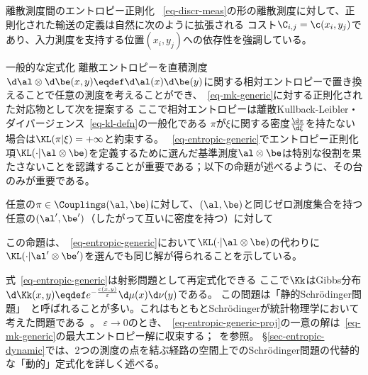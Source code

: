 \begin{rem1}{離散測度間のエントロピー正則化}\label{rem:entrop-reg}
~\eqref{eq-discr-meas}の形の離散測度に対して、正則化された輸送の定義は自然に次のように拡張される
\eql{\label{eq-entropic-disc-meas}
	\MK_\c^\varepsilon(\al,\be) \eqdef \MKD_\C^\varepsilon(\a,\b),
}
コスト$\C_{i,j}=\c(x_i,y_j)$であり、入力測度を支持する位置$(x_i,y_j)$への依存性を強調している。
\end{rem1}


\begin{rem2}{一般的な定式化}
離散エントロピーを直積測度$\d\al\otimes\d\be(x,y) \eqdef \d\al(x)\d\be(y)$に関する相対エントロピーで置き換えることで任意の測度を考えることができ、~\eqref{eq-mk-generic}に対する正則化された対応物として次を提案する
ここで相対エントロピーは離散Kullback-Leibler・ダイバージェンス~\eqref{eq-kl-defn}の一般化である
$\pi$が$\xi$に関する密度$\frac{\d \pi}{\d\xi}$を持たない場合は$\KL(\pi|\xi)=+\infty$と約束する。
%
~\eqref{eq-entropic-generic}でエントロピー正則化項$\KL(\cdot|\al\otimes\be)$を定義するために選んだ基準測度$\al\otimes\be$は特別な役割を果たさないことを認識することが重要である；以下の命題が述べるように、その台のみが重要である。

\begin{prop}
	任意の$\pi \in \Couplings(\al,\be)$に対して、$(\al,\be)$と同じゼロ測度集合を持つ任意の$(\al',\be')$（したがって互いに密度を持つ）に対して
\end{prop}

この命題は、~\eqref{eq-entropic-generic}において$\KL(\cdot|\al\otimes\be)$の代わりに$\KL(\cdot|\al'\otimes\be')$を選んでも同じ解が得られることを示している。


式~\eqref{eq-entropic-generic}は射影問題として再定式化できる
\eql{\label{eq-entropic-generic-proj}
	\umin{\pi \in \Couplings(\al,\be)} \KL(\pi|\Kk),
}
ここで$\Kk$はGibbs分布$\d\Kk(x,y) \eqdef e^{-\frac{c(x,y)}{\varepsilon}} \d\mu(x)\d\nu(y)$である。
%
この問題は「静的Schrödinger問題」~\citep{LeonardSchroedinger,RuschendorfThomsen}と呼ばれることが多い。これはもともとSchrödingerが統計物理学において考えた問題である~\citep{Schroedinger31}。
%
$\varepsilon \rightarrow 0$のとき、~\eqref{eq-entropic-generic-proj}の一意の解は~\eqref{eq-mk-generic}の最大エントロピー解に収束する；~\citep{leonard2012schrodinger,2017-carlier-SIMA}を参照。
%
\S\ref{sec-entropic-dynamic}では、2つの測度の点を結ぶ経路の空間上でのSchrödinger問題の代替的な「動的」定式化を詳しく述べる。
\end{rem2}

